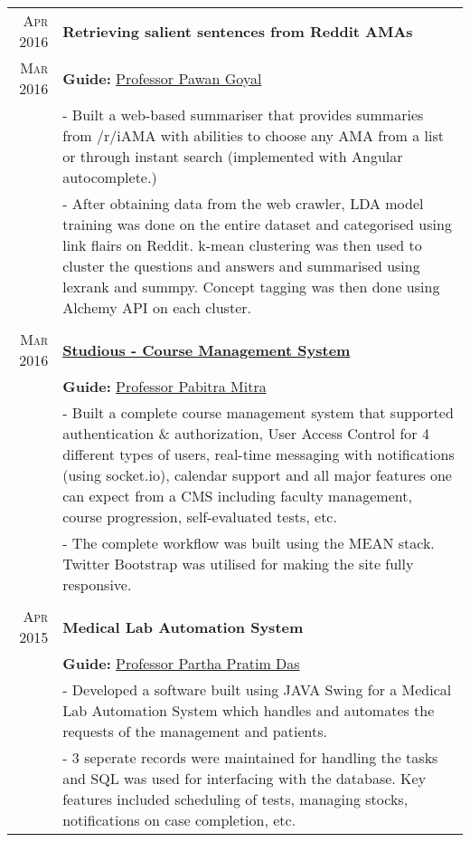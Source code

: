\documentclass[a4paper,10pt]{extarticle} %
\begin{document}
\begin{tabular}{r|p{16cm}}

\textsc{Apr 2016} & \textbf{Retrieving salient sentences from Reddit AMAs} \\
\textsc{Mar 2016} & \textbf{Guide: }\textmd{\href{http://cse.iitkgp.ac.in/~pawang/}{Professor Pawan Goyal}}\\
& \footnotesize{- Built a web-based summariser that provides summaries from /r/iAMA with abilities to choose any AMA from a list or through instant search (implemented with Angular autocomplete.)}\\
& \footnotesize{- After obtaining data from the web crawler, LDA model training was done on the entire dataset and categorised using link flairs on Reddit. k-mean clustering was then used to cluster the questions and answers and summarised using lexrank and summpy. Concept tagging was then done using Alchemy API on each cluster.}\\
\multicolumn{2}{c}{} \\

\textsc{Mar 2016} & \textbf{\href{http://ghostwriternr.me/dbmsass3/}{Studious - Course Management System}}\\
& \textbf{Guide: }\textmd{\href{http://cse.iitkgp.ac.in/~pabitra/}{Professor Pabitra Mitra}}\\
& \footnotesize{- Built a complete course management system that supported authentication \& authorization, User Access Control for 4 different types of users, real-time messaging with notifications (using socket.io), calendar support and all major features one can expect from a CMS including faculty management, course progression, self-evaluated tests, etc.}\\
& \footnotesize{- The complete workflow was built using the MEAN stack. Twitter Bootstrap was utilised for making the site fully responsive.}\\
\multicolumn{2}{c}{} \\

\textsc{Apr 2015} & \textbf{Medical Lab Automation System}\\
& \textbf{Guide: }\textmd{\href{http://www.iitkgp.ac.in/fac-profiles/showprofile.php?empcode=SSmUZ}{Professor Partha Pratim Das}}\\
& \footnotesize{- Developed a software built using JAVA Swing for a Medical Lab Automation System which handles and automates the requests of the management and patients.}\\
& \footnotesize{- 3 seperate records were maintained for handling the tasks and SQL was used for interfacing with the database. Key features included scheduling of tests, managing stocks, notifications on case completion, etc.}\\

\end{tabular}
\end{document}
